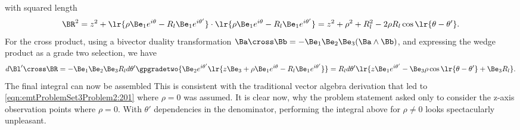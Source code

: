%
with squared length
%
\begin{dmath}\label{eqn:emtProblemSet3Problem2:140}
\BR^2
=
z^2 +
\lr{ \rho \Be_1 e^{i\theta}
-
R_l \Be_1 e^{i \theta'}
}
\cdot
\lr{ \rho \Be_1 e^{i\theta}
-
R_l \Be_1 e^{i \theta'}
}
=
z^2 + \rho^2 + R_l^2 - 2 \rho R_l \cos\lr{ \theta - \theta' }.
\end{dmath}
%
For the cross product, using a bivector duality transformation \( \Ba \cross \Bb = -\Be_1 \Be_2 \Be_3 (\Ba \wedge \Bb) \), and expressing the wedge product as a grade two selection, we have
%
\begin{dmath}\label{eqn:emtProblemSet3Problem2:180}
d\Bl' \cross \BR
=
-\Be_1 \Be_2 \Be_3 R_l d\theta' \gpgradetwo{
\Be_2 e^{i \theta'}
\lr{
z \Be_3 + \rho \Be_1 e^{i\theta}
-
R_l \Be_1 e^{i \theta'}
}
}
=
R_l d\theta' \lr{
z \Be_1 e^{i\theta'}
-
\Be_3 \rho \cos\lr{ \theta - \theta' }
+ \Be_3 R_l
}.
\end{dmath}
%
The final integral can now be assembled
%
%
This is consistent with the traditional vector algebra derivation that led to \cref{eqn:emtProblemSet3Problem2:201} where \( \rho = 0 \) was assumed.
It is clear now, why the problem statement asked only to consider the z-axis observation points where \( \rho = 0 \).  With \( \theta' \) dependencies in the denominator, performing the integral above for \( \rho \ne 0 \) looks spectacularly unpleasant.
%
